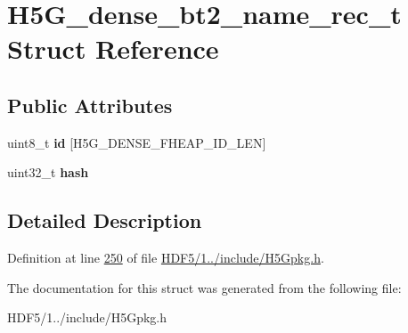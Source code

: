 \hypertarget{struct_h5_g__dense__bt2__name__rec__t}{}\section{H5\+G\+\_\+dense\+\_\+bt2\+\_\+name\+\_\+rec\+\_\+t Struct Reference}
\label{struct_h5_g__dense__bt2__name__rec__t}
\subsection*{Public Attributes}
\begin{DoxyCompactItemize}
\item 
\mbox{\label{struct_h5_g__dense__bt2__name__rec__t_a2aded62e7e7158f11c0ee0c8bf8190b3}} 
uint8\+\_\+t {\bfseries id} \mbox{[}H5\+G\+\_\+\+D\+E\+N\+S\+E\+\_\+\+F\+H\+E\+A\+P\+\_\+\+I\+D\+\_\+\+L\+EN\mbox{]}
\item 
\mbox{\label{struct_h5_g__dense__bt2__name__rec__t_a1ed90f7050f88c96a8e42dbbcc30559f}} 
uint32\+\_\+t {\bfseries hash}
\end{DoxyCompactItemize}


\subsection{Detailed Description}


Definition at line \hyperlink{_h_d_f5_21_810_81_2include_2_h5_gpkg_8h_source_l00250}{250} of file \hyperlink{_h_d_f5_21_810_81_2include_2_h5_gpkg_8h_source}{H\+D\+F5/1../include/\+H5\+Gpkg.\+h}.



The documentation for this struct was generated from the following file\+:\begin{DoxyCompactItemize}
\item 
H\+D\+F5/1../include/\+H5\+Gpkg.\+h\end{DoxyCompactItemize}
